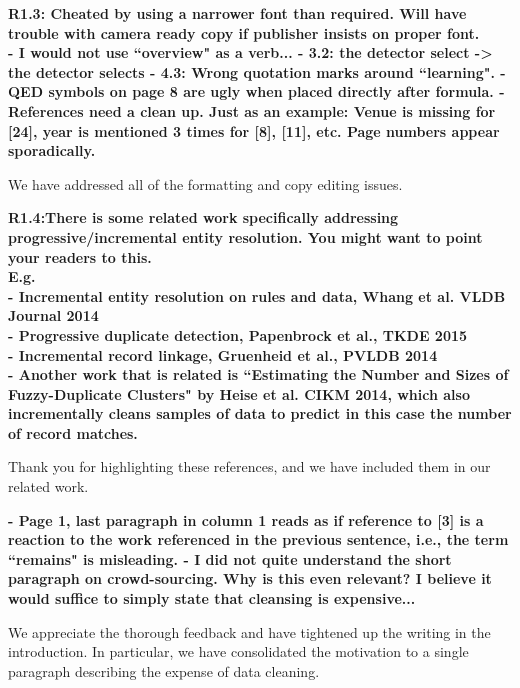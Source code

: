 \vspace{0.5em}

\noindent\textbf{R1.3: Cheated by using a narrower font than required. Will have trouble with camera ready copy if publisher insists on proper font.\\
- I would not use ``overview" as a verb...
- 3.2: the detector select -> the detector selects
- 4.3: Wrong quotation marks around ``learning".
- QED symbols on page 8 are ugly when placed directly after formula. 
- References need a clean up. Just as an example: Venue is missing for [24], year is mentioned 3 times for [8], [11], etc. Page numbers appear sporadically.}

We have addressed all of the formatting and copy editing issues.

\vspace{0.5em}

\noindent\textbf{R1.4:There is some related work specifically addressing progressive/incremental entity resolution. You might want to point your readers to this.
\\E.g.
\\- Incremental entity resolution on rules and data, Whang et al. VLDB Journal 2014
\\- Progressive duplicate detection, Papenbrock et al., TKDE 2015
\\- Incremental record linkage, Gruenheid et al., PVLDB 2014
\\- Another work that is related is ``Estimating the Number and Sizes of Fuzzy-Duplicate Clusters" by Heise et al. CIKM 2014, which also incrementally cleans samples of data to predict in this case the number of record matches.}

Thank you for highlighting these references, and we have included them in our related work.

\vspace{0.5em}

\noindent\textbf{- Page 1, last paragraph in column 1 reads as if reference to [3] is a reaction to the work referenced in the previous sentence, i.e., the term ``remains" is misleading.
- I did not quite understand the short paragraph on crowd-sourcing. Why is this even relevant?
 I believe it would suffice to simply state that cleansing is expensive...}

We appreciate the thorough feedback and have tightened up the writing in the introduction. In particular, we have consolidated the motivation to a single paragraph describing the expense of data cleaning.


